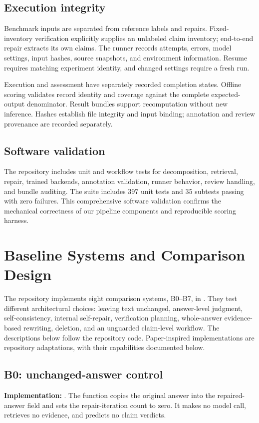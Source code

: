 \documentclass[11pt,a4paper]{article}
\newcommand{\code}[1]{\texttt{\detokenize{#1}}}
\begin{document}
\subsection{Execution integrity}
Benchmark inputs are separated from reference labels and repairs. Fixed-inventory verification explicitly supplies an unlabeled claim inventory; end-to-end repair extracts its own claims. The runner records attempts, errors, model settings, input hashes, source snapshots, and environment information. Resume requires matching experiment identity, and changed settings require a fresh run.

Execution and assessment have separately recorded completion states. Offline scoring validates record identity and coverage against the complete expected-output denominator. Result bundles support recomputation without new inference. Hashes establish file integrity and input binding; annotation and review provenance are recorded separately.

\subsection{Software validation}
The repository includes unit and workflow tests for decomposition, retrieval, repair, trained backends, annotation validation, runner behavior, review handling, and bundle auditing. The suite includes 397 unit tests and 35 subtests passing with zero failures. This comprehensive software validation confirms the mechanical correctness of our pipeline components and reproducible scoring harness.

\section{Baseline Systems and Comparison Design}
\label{sec:baselines}
The repository implements eight comparison systems, B0--B7, in \code{src/baselines/}. They test different architectural choices: leaving text unchanged, answer-level judgment, self-consistency, internal self-repair, verification planning, whole-answer evidence-based rewriting, deletion, and an unguarded claim-level workflow. The descriptions below follow the repository code. Paper-inspired implementations are repository adaptations, with their capabilities documented below.

\subsection{B0: unchanged-answer control}
\textbf{Implementation:} \code{b0_no_repair.py}. The function copies the original answer into the repaired-answer field and sets the repair-iteration count to zero. It makes no model call, retrieves no evidence, and predicts no claim verdicts.
\end{document}
